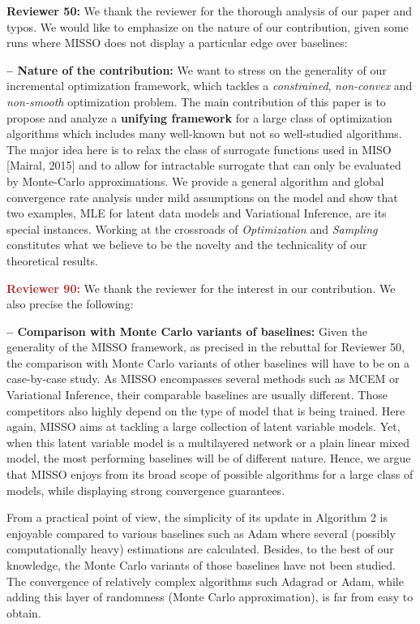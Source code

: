 \documentclass{article}
\begin{document}
\medskip
\textbf{\textcolor{green!50!black}{Reviewer 50:}} We thank the reviewer for the thorough analysis of our paper and typos. 
We would like to emphasize on the nature of our contribution, given some runs where MISSO does not display a particular edge over baselines: 


\vspace{0.03in}
\textbf{-- Nature of the contribution:} 
We want to stress on the generality of our incremental optimization framework, which tackles a \emph{constrained}, \emph{non-convex} and \emph{non-smooth} optimization problem. 
The main contribution of this paper is to propose and analyze a \textbf{unifying framework} for a large class of optimization algorithms which includes many well-known but not so well-studied algorithms.
The major idea here is to relax the class of surrogate functions used in MISO [Mairal, 2015] and to allow for intractable surrogate that can only be evaluated by Monte-Carlo approximations.
We provide a general algorithm and global convergence rate analysis under mild assumptions on the model and show that two examples, MLE for latent data models and Variational Inference, are its special instances.
Working at the crossroads of \emph{Optimization} and \emph{Sampling} constitutes what we believe to be the novelty and the technicality of our theoretical results.


\medskip
\textbf{\textcolor{brown}{Reviewer 90:}} We thank the reviewer for the interest in our contribution. We also precise the following: 

\vspace{0.03in}
\textbf{-- Comparison with Monte Carlo variants of baselines:}
Given the generality of the MISSO framework, as precised in the rebuttal for \textcolor{green!50!black}{Reviewer 50}, the comparison with Monte Carlo variants of other baselines will have to be on a case-by-case study.
As MISSO encompasses several methods such as MCEM or Variational Inference, their comparable baselines are usually different.
Those competitors also highly depend on the type of model that is being trained. 
Here again, MISSO aims at tackling a large collection of latent variable models.
Yet, when this latent variable model is a multilayered network or a plain linear mixed model, the most performing baselines will be of different nature.
Hence, we argue that MISSO enjoys from its broad scope of possible algorithms for a large class of models, while displaying strong convergence guarantees.

From a practical point of view, the simplicity of its update in Algorithm 2 is enjoyable compared to various baselines such as Adam where several (possibly computationally heavy) estimations are calculated.
Besides, to the best of our knowledge, the Monte Carlo variants of those baselines have not been studied.
The convergence of relatively complex algorithms such Adagrad or Adam, while adding this layer of randomness (Monte Carlo approximation), is far from easy to obtain.
\end{document}
